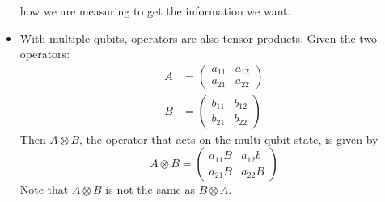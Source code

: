 \begin{itemize}
		how we are measuring to get the information we want. 
	\item With multiple qubits, operators are also tensor products. Given the two operators:
		\begin{align*}
			A &= \begin{pmatrix} a_{11} & a_{12}\\ a_{21} & a_{22} \end{pmatrix} \\
			B&= \begin{pmatrix} b_{11} & b_{12}\\ b_{21} & b_{22} \end{pmatrix}  
		\end{align*}
		Then \( A \otimes B \), the operator that acts on the multi-qubit state, is given by 
		\[
			A \otimes B = \begin{pmatrix} a_{11}B & a_{12}b\\a_{21}B & a_{22}B \end{pmatrix} 
		\] 
		Note that \( A \otimes B \) is not the same as \( B \otimes A \). 
\end{itemize}
